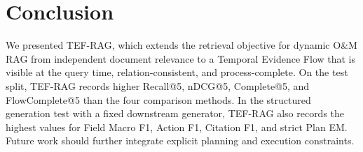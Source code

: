 \section{Conclusion}
\label{sec:conclusion}

We presented TEF-RAG, which extends the retrieval objective for dynamic O\&M RAG from independent document relevance to a Temporal Evidence Flow that is visible at the query time, relation-consistent, and process-complete.
On the test split, TEF-RAG records higher Recall@5, nDCG@5, Complete@5, and FlowComplete@5 than the four comparison methods. In the structured generation test with a fixed downstream generator, TEF-RAG also records the highest values for Field Macro F1, Action F1, Citation F1, and strict Plan EM.
Future work should further integrate explicit planning and execution constraints.
